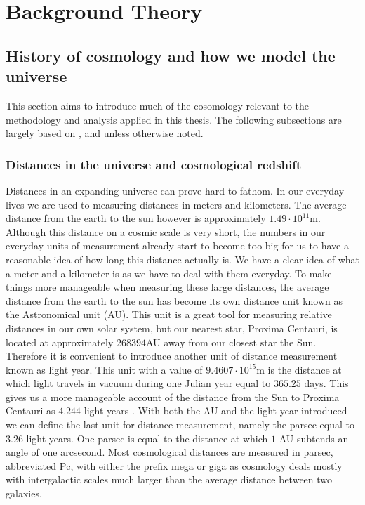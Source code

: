 \chapter{Background Theory}\label{sec:backgroundtheory}
\section{History of cosmology and how we model the universe}
This section aims to introduce much of the cosomology relevant to the methodology and analysis applied in this thesis.
The following subsections are largely based on \cite[ch.7]{schneider2006extragalactic}, \cite[ch.2]{Dodelson:1282338} and \cite{ryden2017introduction} unless otherwise noted.
\subsection{Distances in the universe and cosmological redshift}\label{sec:sec_distance}
Distances in an expanding universe can prove hard to fathom. In our everyday
lives we are used to measuring distances in meters and kilometers. The
average distance from the earth to the sun however is approximately $1.49\cdot10^{11}$m.
Although this distance on a cosmic scale is very short, the numbers in our
everyday units of measurement already start to become too big for us to have a
reasonable idea of how long this distance actually is. We have a clear idea of
what a meter and a kilometer is as we have to deal with them everyday. To make
things more manageable when measuring these large distances, the average distance
from the earth to the sun has become its own distance unit known as the
Astronomical unit (AU). This unit is a great tool for measuring relative
distances in our own solar system, but our nearest star, Proxima Centauri, is
located at approximately $268394$AU away from our closest star the Sun.
Therefore it is convenient to introduce another unit of distance measurement known as light year. This unit with a value of $9.4607\cdot10^{15}$m is the distance at
which light travels in vacuum during one Julian year equal to $365.25$ days.
This gives us a more manageable account of the distance from the Sun to Proxima
Centauri as $4.244$ light years \cite{Brown2020GaiaED}. With both the AU and the light year introduced
we can define the last unit for distance measurement, namely the parsec equal to $3.26$
light years. One parsec is equal to the distance at which $1$ AU subtends an angle
of one arcsecond. Most
cosmological distances are measured in parsec, abbreviated Pc, with either the
prefix mega or giga as cosmology deals mostly with intergalactic scales much
larger than the average distance between two galaxies.\\

